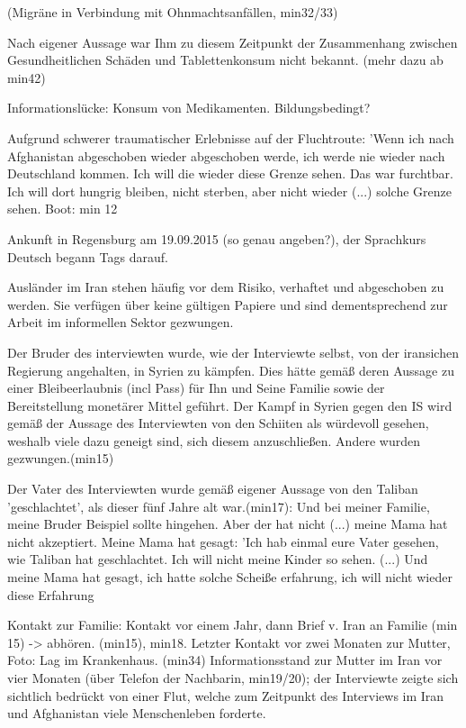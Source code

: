 \documentclass[12pt,oneside]{article}
\begin{document}
(Migräne in Verbindung mit Ohnmachtsanfällen, min32/33)

Nach eigener Aussage war Ihm zu diesem Zeitpunkt der Zusammenhang zwischen Gesundheitlichen Schäden und Tablettenkonsum nicht bekannt. (mehr dazu ab min42)


Informationslücke: Konsum von Medikamenten. Bildungsbedingt?

Aufgrund schwerer traumatischer Erlebnisse auf der Fluchtroute: 'Wenn ich nach Afghanistan abgeschoben wieder abgeschoben werde, ich werde nie wieder nach Deutschland kommen. Ich will die wieder diese Grenze sehen. Das war furchtbar. Ich will dort hungrig bleiben, nicht sterben, aber nicht wieder (...) solche Grenze sehen. 
Boot: min 12

Ankunft in Regensburg am 19.09.2015 (so genau angeben?), der Sprachkurs Deutsch begann Tags darauf.

Ausländer im Iran stehen häufig vor dem Risiko, verhaftet und abgeschoben zu werden. Sie verfügen über keine gültigen Papiere und sind dementsprechend  zur Arbeit im informellen Sektor gezwungen.

Der Bruder des interviewten wurde, wie der Interviewte selbst, von der iransichen Regierung angehalten, in Syrien zu kämpfen. Dies hätte gemäß deren Aussage zu einer Bleibeerlaubnis (incl Pass) für Ihn und Seine Familie sowie der Bereitstellung monetärer Mittel geführt.
Der Kampf in Syrien gegen den IS wird gemäß der Aussage des Interviewten von den Schiiten als würdevoll gesehen, weshalb viele dazu geneigt sind, sich diesem anzuschließen. Andere wurden gezwungen.(min15)

Der Vater des Interviewten wurde gemäß eigener Aussage von den Taliban 'geschlachtet', als dieser fünf Jahre alt war.(min17): Und bei meiner Familie, meine Bruder Beispiel sollte hingehen. Aber der hat nicht (...) meine Mama hat nicht akzeptiert. Meine Mama hat gesagt: 'Ich hab einmal eure Vater gesehen, wie Taliban hat geschlachtet. Ich will nicht meine Kinder so sehen. (...) Und meine Mama hat gesagt, ich hatte solche Scheiße erfahrung, ich will nicht wieder diese Erfahrung 

Kontakt zur Familie: Kontakt vor einem Jahr, dann Brief v. Iran an Familie (min 15) -> abhören. (min15), min18. 
Letzter Kontakt vor zwei Monaten zur Mutter, Foto: Lag im Krankenhaus. (min34) 
Informationsstand zur Mutter im Iran vor vier Monaten (über Telefon der Nachbarin, min19/20); der Interviewte zeigte sich sichtlich bedrückt von einer Flut, welche zum Zeitpunkt des Interviews im Iran und Afghanistan viele Menschenleben forderte.
\end{document}
